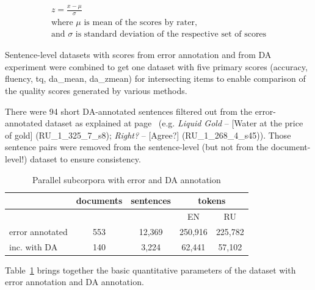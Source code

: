 
\begin{equation}\label{eq:zscore}
\begin{split}
z = \frac{x - \mu}{\sigma} \\
\text{where $\mu$ is mean of the scores by rater,} \\
\text{and $\sigma$ is standard deviation of the respective set of scores}
\end{split}
\end{equation}

Sentence-level datasets with scores from error annotation and from DA experiment were combined to get one dataset with five primary scores (accuracy, fluency, tq, da\_mean, da\_zmean) for intersecting items to enable comparison of the quality scores generated by various methods. 

There were 94 short DA-annotated sentences filtered out from the error-annotated dataset as explained at page~\pageref{pg:shorts_filtered_out} (e.g. \textit{Liquid Gold} --  [Water at the price of gold] (RU\_1\_325\_7\_s8); \textit{Right?} --  [Agree?] (RU\_1\_268\_4\_s45)).
Those sentence pairs were removed from the sentence-level (but not from the document-level!) dataset to ensure consistency.
\begin{table}[H]
	\centering
	\begin{tabular}{l|c|c|cc}
		\toprule
		
		& documents & sentences & \multicolumn{2}{c}{tokens} \\
		\midrule
		&      &        & EN      &  RU \\
		error annotated & 553  & 12,369 & 250,916 & 225,782 \\
		\hspace{1em} inc. with DA & 140  & 3,224 & 62,441 & 57,102 \\
		\bottomrule
	\end{tabular}
	\caption{\label{tab:sent_err_da} Parallel subcorpora with error and DA annotation}
\end{table}

Table~\ref{tab:sent_err_da} brings together the basic quantitative parameters of the dataset with error annotation and DA annotation.

